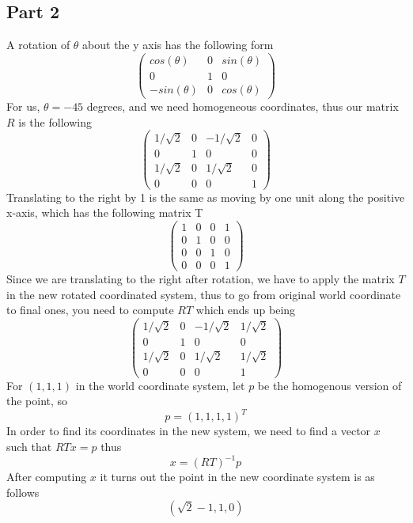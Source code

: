 \documentclass[11pt,psfig]{article}
\begin{document}
\newpage

\subsection{Part 2}

A rotation of $\theta$ about the y axis has the following form
\[ \left( \begin{array}{ccc}
cos(\theta) & 0 & sin(\theta) \\
0 & 1 & 0 \\
-sin(\theta) & 0 & cos(\theta) \end{array} \right)\]
For us, $\theta=-45$ degrees, and we need homogeneous coordinates, thus our matrix $R$ is the following
\[ \left( \begin{array}{cccc}
1/\sqrt{2} & 0 & -1/\sqrt{2} & 0 \\
0 & 1 & 0 & 0\\
1/\sqrt{2} & 0 & 1/\sqrt{2} & 0 \\
0 & 0 & 0 & 1 \end{array} \right)\]
Translating to the right by 1 is the same as moving by one unit along the positive x-axis, which has the following matrix T 
\[ \left( \begin{array}{cccc}
1 & 0 & 0 & 1 \\
0 & 1 & 0 & 0\\
0 & 0 & 1 & 0 \\
0 & 0 & 0 & 1 \end{array} \right)\]
Since we are translating to the right after rotation, we have to apply the matrix $T$ in the new rotated coordinated system, thus to go from original world coordinate to final ones, you need to compute $RT$ which ends up being
\[ \left( \begin{array}{cccc}
1/\sqrt{2} & 0 & -1/\sqrt{2} & 1/\sqrt{2} \\
0 & 1 & 0 & 0\\
1/\sqrt{2} & 0 & 1/\sqrt{2} & 1/\sqrt{2} \\
0 & 0 & 0 & 1 \end{array} \right)\]
For $(1,1,1)$ in the world coordinate system, let $p$ be the homogenous version of the point, so 
\[
p=(1,1,1,1)^T
\]
In order to find its coordinates in the new system, we need to find a vector $x$ such that $RTx=p$ thus 
\[
x=(RT)^{-1} p
\] 
After computing $x$ it turns out the point in the new coordinate system is as follows
\[
(\sqrt{2} - 1, 1,0)
\]
\end{document}
